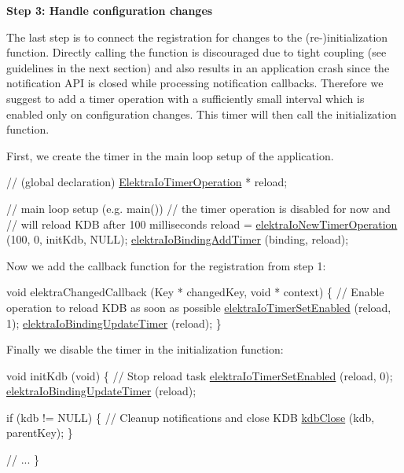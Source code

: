 {\bfseries Step 3\+: Handle configuration changes}

The last step is to connect the registration for changes to the (re-\/)initialization function. Directly calling the function is discouraged due to tight coupling (see guidelines in the next section) and also results in an application crash since the notification A\+PI is closed while processing notification callbacks. Therefore we suggest to add a timer operation with a sufficiently small interval which is enabled only on configuration changes. This timer will then call the initialization function.

First, we create the timer in the main loop setup of the application.


\begin{DoxyCode}
\textcolor{comment}{// (global declaration)}
\hyperlink{kdbio_8h_a09c40c890207a8244fc39bb930fee1fa}{ElektraIoTimerOperation} * reload;

\textcolor{comment}{// main loop setup (e.g. main())}
\textcolor{comment}{// the timer operation is disabled for now and}
\textcolor{comment}{// will reload KDB after 100 milliseconds}
reload = \hyperlink{io_8c_a67a0a81d263e0a7853809144c4ea5198}{elektraIoNewTimerOperation} (100, 0, initKdb, NULL);
\hyperlink{io_8c_a1d61dca5ec35900c33224d82711c0bdb}{elektraIoBindingAddTimer} (binding, reload);
\end{DoxyCode}


Now we add the callback function for the registration from step 1\+:


\begin{DoxyCode}
\textcolor{keywordtype}{void} elektraChangedCallback (Key * changedKey, \textcolor{keywordtype}{void} * context)
\{
        \textcolor{comment}{// Enable operation to reload KDB as soon as possible}
        \hyperlink{io_8c_a301cebc4da212bdb3aac0ad84f70ad85}{elektraIoTimerSetEnabled} (reload, 1);
        \hyperlink{io_8c_add5679a2ff842d88435938d629497e27}{elektraIoBindingUpdateTimer} (reload);
\}
\end{DoxyCode}


Finally we disable the timer in the initialization function\+:


\begin{DoxyCode}
\textcolor{keywordtype}{void} initKdb (\textcolor{keywordtype}{void})
\{
        \textcolor{comment}{// Stop reload task}
        \hyperlink{io_8c_a301cebc4da212bdb3aac0ad84f70ad85}{elektraIoTimerSetEnabled} (reload, 0);
        \hyperlink{io_8c_add5679a2ff842d88435938d629497e27}{elektraIoBindingUpdateTimer} (reload);

        \textcolor{keywordflow}{if} (kdb != NULL)
        \{
                \textcolor{comment}{// Cleanup notifications and close KDB}
                \hyperlink{group__kdb_gadb54dc9fda17ee07deb9444df745c96f}{kdbClose} (kdb, parentKey);
        \}

        \textcolor{comment}{// ...}
\}
\end{DoxyCode}


